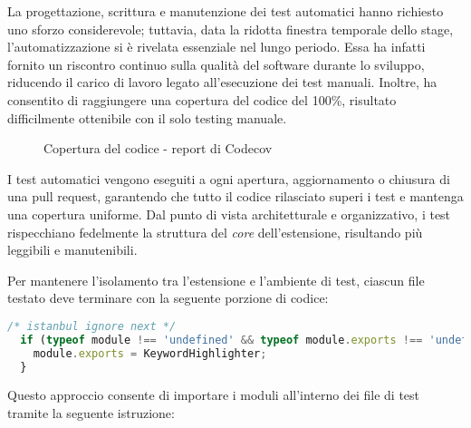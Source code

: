 \vspace{10pt}
\par\noindent La progettazione, scrittura e manutenzione dei test automatici hanno richiesto uno sforzo considerevole; tuttavia, data la ridotta finestra temporale dello stage, l’automatizzazione si è rivelata essenziale nel lungo periodo. Essa ha infatti fornito un riscontro continuo sulla qualità del software durante lo sviluppo, riducendo il carico di lavoro legato all’esecuzione dei test manuali. Inoltre, ha consentito di raggiungere una copertura del codice del 100\%, risultato difficilmente ottenibile con il solo testing manuale.

\begin{figure}[H]
  \centering 
  \caption{Copertura del codice - report di Codecov}
\end{figure}

\par\noindent I test automatici vengono eseguiti a ogni apertura, aggiornamento o chiusura di una \gls{pull request}, garantendo che tutto il codice rilasciato superi i test e mantenga una copertura uniforme. Dal punto di vista architetturale e organizzativo, i test rispecchiano fedelmente la struttura del \textit{core} dell’estensione, risultando più leggibili e manutenibili. 

\vspace{10pt}
\begin{samepage}
\end{samepage}

\vspace{10pt}
\par\noindent Per mantenere l’isolamento tra l'estensione e l’ambiente di test, ciascun file testato deve terminare con la seguente porzione di codice:

\vspace{10pt}
\begin{samepage}
\begin{lstlisting}[language=JavaScript]
  /* istanbul ignore next */
  if (typeof module !== 'undefined' && typeof module.exports !== 'undefined') {
    module.exports = KeywordHighlighter;
  }
\end{lstlisting}
\end{samepage}

\vspace{10pt}
\par\noindent Questo approccio consente di importare i moduli all’interno dei file di test tramite la seguente istruzione:

